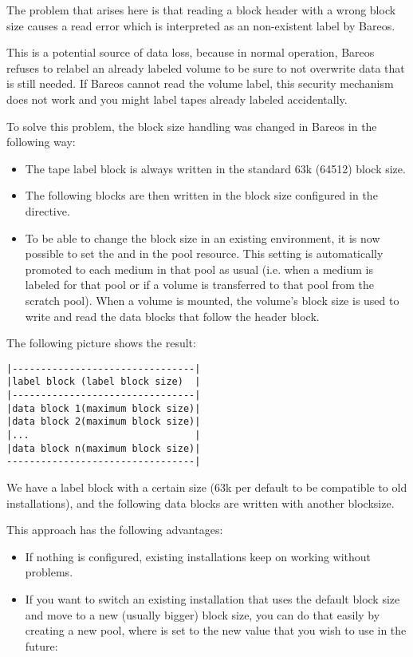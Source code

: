 The problem that arises here is that reading a block header with a wrong block size causes
a read error which is interpreted as an non-existent label by Bareos.

This is a potential source of data loss, because in normal operation, Bareos refuses to
relabel an already labeled volume to be sure to not overwrite data that is still needed.
If Bareos cannot read the volume label, this security mechanism does not work and you might
label tapes already labeled accidentally.

To solve this problem, the block size handling was changed in Bareos  in the following way:
\begin{itemize}
\item  The tape label block is always written in the standard 63k (64512) block size.
\item  The following blocks are then written in the block size configured in the  directive.
\item  To be able to change the block size in an existing environment, it is now
    possible to set the 
    and
    in the pool resource. This setting is automatically promoted to each medium in
that pool as usual (i.e. when a medium is labeled for that pool or if a volume is transferred to that pool from the scratch pool).
When a volume is mounted, the volume's block size is
used to write and read the data blocks that follow the header block.
\end{itemize}

The following picture shows the result:
\begin{verbatim}
|--------------------------------|
|label block (label block size)  |
|--------------------------------|
|data block 1(maximum block size)|
|data block 2(maximum block size)|
|...                             |
|data block n(maximum block size)|
---------------------------------|
\end{verbatim}
We have a label block with a certain size (63k per default to be compatible to old installations),
and the following data blocks are written with another blocksize.


This approach has the following advantages:
\begin{itemize}
\item If nothing is configured, existing installations keep on working without problems.
\item If you want to switch an existing installation that uses the default
block size and move to a new (usually bigger) block size, you can do that
easily by creating a new pool, where  is set to the new
value that you wish to use in the future:
\end{itemize}


